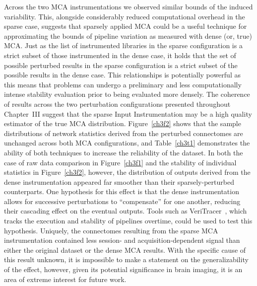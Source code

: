 Across the two MCA instrumentations we observed similar bounds of the induced variability. This, alongside
considerably reduced computational overhead in the sparse case, suggests that sparsely applied MCA could be a
useful technique for approximating the bounds of pipeline variation as measured with dense (or, true) MCA. Just as
the list of instrumented libraries in the sparse configuration is a strict subset of those instrumented in the
dense case, it holds that the set of possible perturbed results in the sparse configuration is a strict subset of
the possible results in the dense case. This relationships is potentially powerful as this means that problems can
undergo a preliminary and less computationally intense stability evaluation prior to being evaluated more densely.
The coherence of results across the two perturbation configurations presented throughout Chapter~III suggest that
the sparse Input Instrumentation may be a high quality estimator of the true MCA distribution. Figure~\ref{ch3f2}
shows that the sample distributions of network statistics derived from the perturbed connectomes are unchanged
across both MCA configurations, and Table~\ref{ch3t1} demonstrates the ability of both techniques to increase the
reliability of the dataset. In both the case of raw data comparison in Figure~\ref{ch3f1} and the stability of
individual statistics in Figure~\ref{ch3f2}, however, the distribution of outputs derived from the dense
instrumentation appeared far smoother than their sparsely-perturbed counterparts. One hypothesis for this effect
is that the dense instrumentation allows for successive perturbations to ``compensate'' for one another, reducing
their cascading effect on the eventual outputs. Tools such as VeriTracer~\cite{chatelain2018veritracer}, which
tracks the execution and stability of pipelines overtime, could be used to test this hypothesis. Uniquely, the
connectomes resulting from the sparse MCA instrumentation contained less session- and acquisition-dependent signal
than either the original dataset or the dense MCA results. With the specific cause of this result unknown, it is
impossible to make a statement on the generalizability of the effect, however, given its potential significance in
brain imaging, it is an area of extreme interest for future work.

